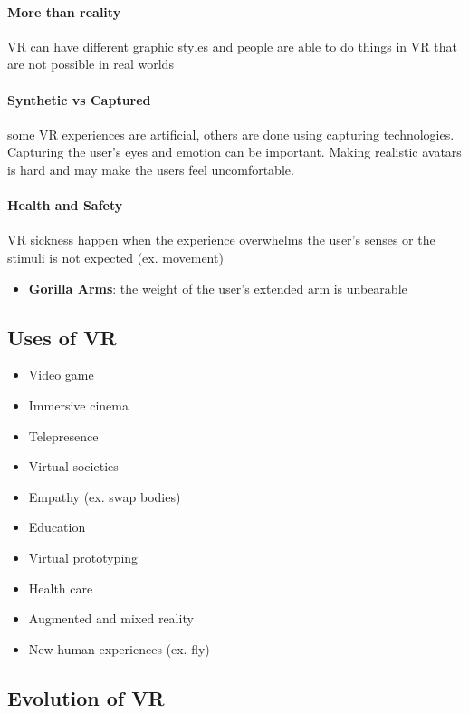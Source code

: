     \paragraph{More than reality} VR can have different graphic styles and
    people are able to do things in VR that are not possible in real worlds

    \paragraph{Synthetic vs Captured} some VR experiences are artificial,
    others are done using capturing technologies. Capturing the user's
    eyes and emotion can be important. Making realistic avatars is hard
    and may make the users feel uncomfortable.

    \paragraph{Health and Safety} VR sickness happen when the experience
    overwhelms the user's senses or the stimuli is not expected (ex. movement)
    \begin{itemize}
      \item \textbf{Gorilla Arms}: the weight of the user's extended arm is
      unbearable
    \end{itemize}

  \subsection{Uses of VR}

    \begin{itemize}
      \item Video game
      \item Immersive cinema
      \item Telepresence
      \item Virtual societies
      \item Empathy (ex. swap bodies)
      \item Education
      \item Virtual prototyping
      \item Health care
      \item Augmented and mixed reality
      \item New human experiences (ex. fly)
    \end{itemize}

  \subsection{Evolution of VR}

